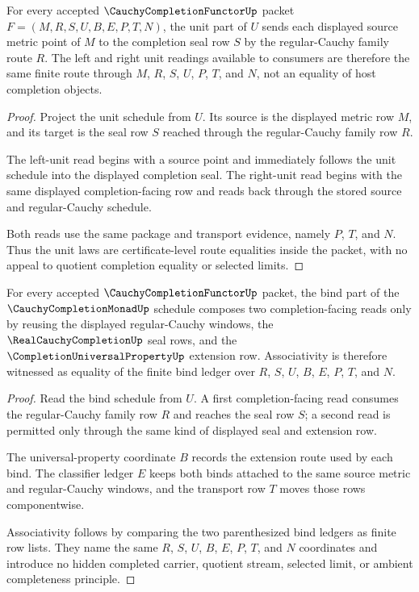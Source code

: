 \begin{theorem}
\label{thm:cauchycompletionfunctor-unit-laws}
For every accepted $\CauchyCompletionFunctorUp$ packet $F=(M,R,S,U,B,E,P,T,N)$, the unit part of $U$ sends each displayed source metric point of $M$ to the completion seal row $S$ by the regular-Cauchy family route $R$. The left and right unit readings available to consumers are therefore the same finite route through $M$, $R$, $S$, $U$, $P$, $T$, and $N$, not an equality of host completion objects.
\end{theorem}
\begin{proof}
Project the unit schedule from $U$. Its source is the displayed metric row $M$, and its target is the seal row $S$ reached through the regular-Cauchy family row $R$.

The left-unit read begins with a source point and immediately follows the unit schedule into the displayed completion seal. The right-unit read begins with the same displayed completion-facing row and reads back through the stored source and regular-Cauchy schedule.

Both reads use the same package and transport evidence, namely $P$, $T$, and $N$. Thus the unit laws are certificate-level route equalities inside the packet, with no appeal to quotient completion equality or selected limits.
\end{proof}

\begin{theorem}
\label{thm:cauchycompletionfunctor-multiplication-laws}
For every accepted $\CauchyCompletionFunctorUp$ packet, the bind part of the $\CauchyCompletionMonadUp$ schedule composes two completion-facing reads only by reusing the displayed regular-Cauchy windows, the $\RealCauchyCompletionUp$ seal rows, and the $\CompletionUniversalPropertyUp$ extension row. Associativity is therefore witnessed as equality of the finite bind ledger over $R$, $S$, $U$, $B$, $E$, $P$, $T$, and $N$.
\end{theorem}
\begin{proof}
Read the bind schedule from $U$. A first completion-facing read consumes the regular-Cauchy family row $R$ and reaches the seal row $S$; a second read is permitted only through the same kind of displayed seal and extension row.

The universal-property coordinate $B$ records the extension route used by each bind. The classifier ledger $E$ keeps both binds attached to the same source metric and regular-Cauchy windows, and the transport row $T$ moves those rows componentwise.

Associativity follows by comparing the two parenthesized bind ledgers as finite row lists. They name the same $R$, $S$, $U$, $B$, $E$, $P$, $T$, and $N$ coordinates and introduce no hidden completed carrier, quotient stream, selected limit, or ambient completeness principle.
\end{proof}

